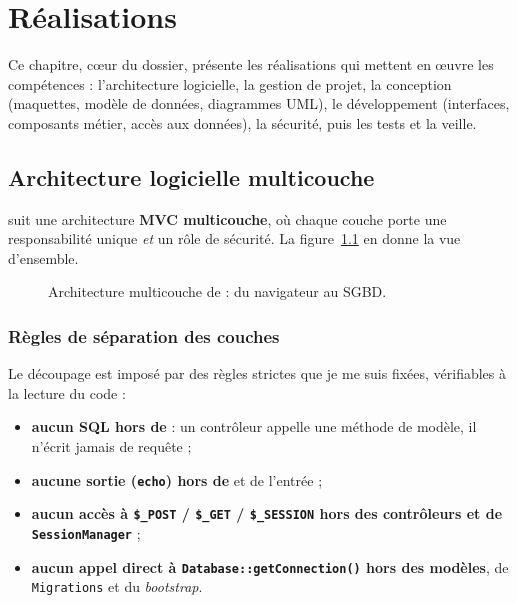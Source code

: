 \chapter{Réalisations}
\label{ch:realisations}

Ce chapitre, cœur du dossier, présente les réalisations qui mettent en œuvre les compétences :
l'architecture logicielle, la gestion de projet, la conception (maquettes, modèle de données,
diagrammes UML), le développement (interfaces, composants métier, accès aux données), la
sécurité, puis les tests et la veille.

\section{Architecture logicielle multicouche}
\label{sec:archi}

\projet{} suit une architecture \textbf{MVC multicouche}, où chaque couche porte une
responsabilité unique \emph{et} un rôle de sécurité. La figure~\ref{fig:archi} en donne la vue
d'ensemble.

\begin{figure}[ht]
\centering

\caption{Architecture multicouche de \projet{} : du navigateur au SGBD.}
\label{fig:archi}
\end{figure}

\subsection{Règles de séparation des couches}

Le découpage est imposé par des règles strictes que je me suis fixées, vérifiables à la lecture du code :

\begin{itemize}
  \item \textbf{aucun SQL hors de } : un contrôleur appelle une méthode de
        modèle, il n'écrit jamais de requête ;
  \item \textbf{aucune sortie (\texttt{echo}) hors de } et de l'entrée
         ;
  \item \textbf{aucun accès à \texttt{\$\_POST} / \texttt{\$\_GET} / \texttt{\$\_SESSION} hors
        des contrôleurs et de \texttt{SessionManager}} ;
  \item \textbf{aucun appel direct à \texttt{Database::getConnection()} hors des modèles}, de
        \texttt{Migrations} et du \emph{bootstrap}.
\end{itemize}

